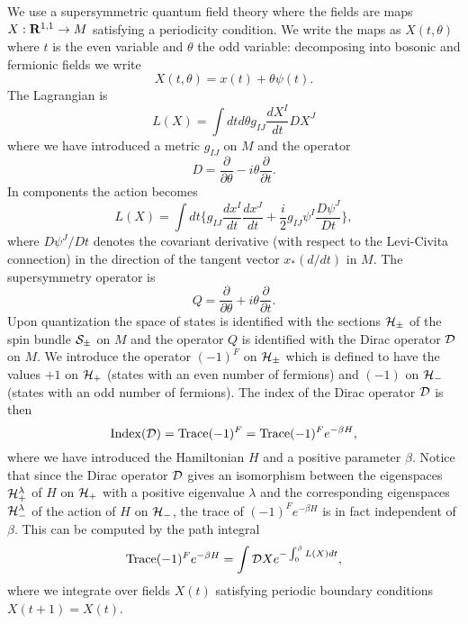 \documentclass[12pt]{article}
\newcommand{\labell}[1] {\label{#1}}
\begin{document}
We use a supersymmetric quantum field theory where the fields
are maps $X: {\mathbf{R}}^{1,1} \to M$ satisfying a periodicity condition.
We write the maps as $X (t, \theta)$ where $t$ is the even variable 
and $\theta$ the odd variable: decomposing into bosonic and fermionic
fields we write
$$ X(t,\theta) = x(t) + \theta \psi(t).$$
The Lagrangian is
$$ L(X) = \int dt d\theta g_{IJ} \frac{dX^I }{dt} D X^J $$
where we have introduced a metric $g_{IJ}$ on $M$ and the 
 operator
$$ D = \frac{\partial}{\partial \theta} - i \theta \frac{\partial}{\partial t}
. $$
In components the action becomes
$$ L(X) = \int dt \{ g_{IJ}  \frac{dx^I}{dt} \frac{dx^J}{dt} 
+ \frac{i}{2} g_{IJ} \psi^I \frac{D\psi^J}{Dt} \}, $$
where $D \psi^J/Dt$ denotes the covariant derivative (with respect
to the Levi-Civita connection) in the direction of 
the tangent vector $x_* (d/dt)$ in  $M$.
The supersymmetry operator is 
$$Q = \frac{\partial }{\partial \theta} +i \theta \frac{\partial }{\partial t}.
$$
\newcommand{\dbar}{{ \cal D} }
Upon quantization the space of states is identified
with the sections ${ \cal H}_{\pm} $ of the 
spin bundle ${ \cal S}_{\pm} $ on $M$ and the operator $Q$ is identified
with the Dirac operator $\dbar$ on $M$.
We introduce the operator $(-1)^F$ on ${ \cal H}_{\pm}$ which is defined
to have the values $+1$ on ${ \cal H}_+$
(states with an even number of fermions) and $(-1)$ on 
${ \cal H}_-$ (states with an 
odd number of fermions). The index of the Dirac operator 
$\dbar$ is then
\begin{equation} \labell{dirac}
{\rm Index} (\dbar) = {\rm Trace} (-1)^F  = 
{\rm Trace } (-1)^F e^{- \beta H}, 
\end{equation}
where we have introduced the Hamiltonian $H$ and a positive parameter
$\beta$. 
Notice that since the Dirac operator $\dbar$ gives an 
isomorphism between the
eigenspaces ${ \cal H}_+^\lambda$ of $H$ on ${ \cal H}_+$ with a positive
eigenvalue $\lambda$ and the corresponding
eigenspaces ${ \cal H}_-^\lambda$ of the action of $H$ on ${ \cal H}_-$,
the trace of $(-1)^F e^{- \beta H} $ is in fact independent of 
$\beta$. 
This can be computed by the path integral 
\begin{equation} \labell{lagrangian}
{\rm Trace } (-1)^F e^{- \beta H} = \int \cald X e^{ - \int_{0}^\beta
L(X) dt},
\end{equation}
where we integrate over fields $X(t) $ satisfying periodic
boundary conditions $X(t+1) = X(t)$. 
\end{document}
